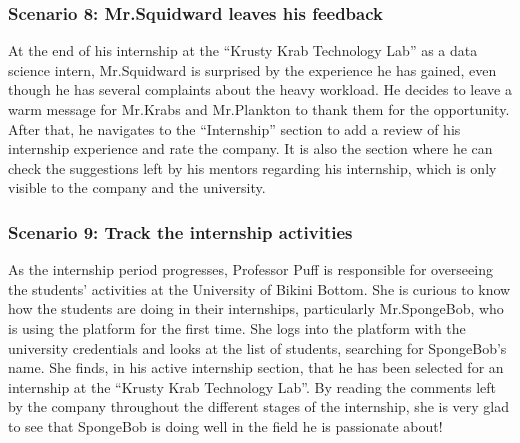 \subsubsection{Scenario 8: Mr.Squidward leaves his feedback}\label{subsubsec:scenario_8}
At the end of his internship at the ``Krusty Krab Technology Lab'' as a data science intern, Mr.Squidward is surprised by the experience 
he has gained, even though he has several complaints about the heavy workload. He decides to leave a warm message for Mr.Krabs and Mr.Plankton 
to thank them for the opportunity. After that, he navigates to the ``Internship'' section to add a review of his internship experience and rate 
the company. It is also the section where he can check the suggestions left by his mentors regarding his internship, which is only visible to the 
company and the university.

\subsubsection{Scenario 9: Track the internship activities}\label{subsubsec:scenario_9}
As the internship period progresses, Professor Puff is responsible for overseeing the students' activities at the University of Bikini Bottom. 
She is curious to know how the students are doing in their internships, particularly Mr.SpongeBob, who is using the platform for the first time. 
She logs into the platform with the university credentials and looks at the list of students, searching for SpongeBob's name. She finds, 
in his active internship section, that he has been selected for an internship at the ``Krusty Krab Technology Lab''. By reading the comments
left by the company throughout the different stages of the internship, she is very glad to see that SpongeBob is doing well in the field he is 
passionate about!


